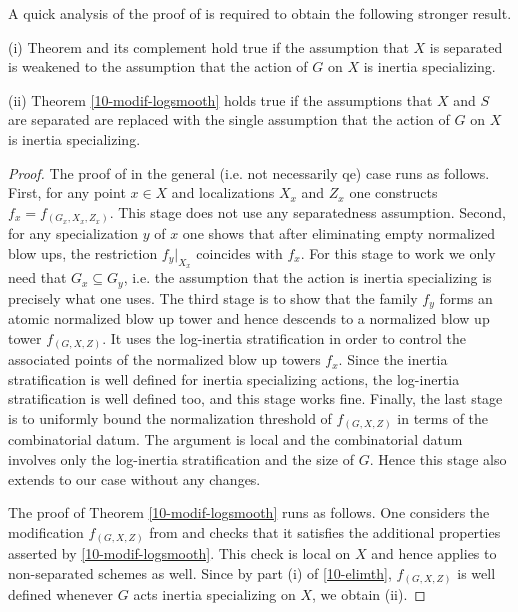 \documentclass[10pt]{../fichiers-configuration-latex/smfart}
\begin{document}
A quick analysis of the proof of  is required
to obtain the following stronger result.

\begin{theorem2}\label{10-elimth}
(i) Theorem  and its complement 
hold true if the assumption that $X$ is separated is weakened to the assumption that
the action of $G$ on $X$ is inertia specializing.

(ii) Theorem \ref{10-modif-logsmooth} holds true if the assumptions that $X$ and $S$ are
separated are replaced with the single assumption that the action of $G$ on $X$ is inertia specializing.
\end{theorem2}
\begin{proof}
The proof of  in the general (i.e. not necessarily qe)
case runs as follows. First, for any point $x\in X$ and localizations $X_x$ and $Z_x$
one constructs $f_x=f_{(G_x,X_x,Z_x)}$. This stage does not use any separatedness assumption.
Second, for any specialization $y$ of $x$ one shows that after eliminating empty normalized
blow ups, the restriction  $f_y|_{X_x}$ coincides with $f_x$. For this stage to work we only
need that $G_x\subseteq G_y$, i.e. the assumption that the action is inertia specializing is
precisely what one uses. The third stage is to show that the family $f_y$ forms an atomic
normalized blow up tower and hence descends to a normalized blow up tower $f_{(G,X,Z)}$.
It uses the log-inertia stratification in order to control the associated points of the
normalized blow up towers $f_x$. Since the inertia stratification is well defined for
inertia specializing actions, the log-inertia stratification is well defined too, and
this stage works fine. Finally, the last stage is to uniformly bound the normalization
threshold of $f_{(G,X,Z)}$ in terms of the combinatorial datum. The argument is local
and the combinatorial datum involves only the log-inertia stratification and the size
of $G$. Hence this stage also extends to our case without any changes.

The proof of Theorem \ref{10-modif-logsmooth} runs as follows. One considers the modification
$f_{(G,X,Z)}$ from  and checks that it satisfies the additional
properties asserted by \ref{10-modif-logsmooth}. This check is local on $X$ and hence applies to
non-separated schemes as well. Since  by part (i) of \ref{10-elimth}, $f_{(G,X,Z)}$ is well defined
whenever $G$ acts inertia specializing on $X$, we obtain (ii).
\end{proof}
\end{document}
